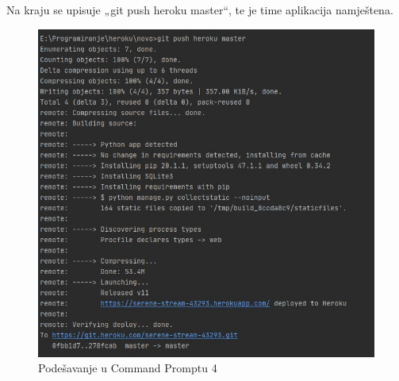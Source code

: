 			\noindent Na kraju se upisuje „git push heroku master“, te je time aplikacija namještena.
			
			\begin{figure}[H]
				\centerfloat
				\includegraphics[scale=0.4]{slike/pustanjeupogon4.jpeg} %
				\caption{Podešavanje u Command Promptu 4}
				
			\end{figure}
			
			\eject 